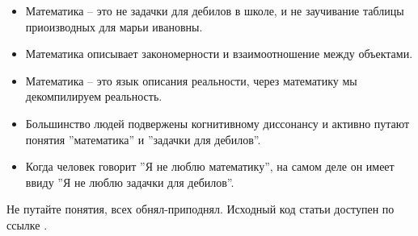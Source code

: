 \begin{itemize}
    \item Математика -- это не задачки для дебилов в школе, и не заучивание таблицы приоизводных для марьи ивановны.
    \item Математика описывает закономерности и взаимоотношение между объектами.
    \item Математика -- это язык описания реальности, через математику мы декомпилируем реальность.
    \item Большинство людей подвержены когнитивному диссонансу и активно путают понятия ''математика'' и ''задачки для дебилов''.
    \item Когда человек говорит ''Я не люблю математику'', на самом деле он имеет ввиду ''Я не люблю задачки для дебилов''.
\end{itemize}
Не путайте понятия, всех обнял-приподнял.
Исходный код статьи доступен по ссылке \cite{MathIsNecessary_2022}.